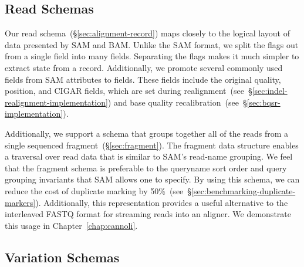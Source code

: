 \documentclass[phd]{ucbthesis}
\begin{document}
\subsection{Read Schemas}
\label{sec:read-schemas}

Our read schema~(\S\ref{sec:alignment-record}) maps closely to the logical layout of data presented by
{SAM} and {BAM}. Unlike the {SAM} format, we split the
flags out from a single field into many fields. Separating the flags makes it much simpler to
extract state from a record. Additionally, we promote several commonly used
fields from {SAM} attributes to fields. These fields include the original
quality, position, and CIGAR fields, which are set during
realignment~(see~\S\ref{sec:indel-realignment-implementation}) and base quality
recalibration~(see~\S\ref{sec:bqsr-implementation}).

Additionally, we support a schema that groups together all of the reads from a
single sequenced fragment~(\S\ref{sec:fragment}). The fragment data structure enables a traversal over read data that
is similar to {SAM}'s read-name grouping.
We feel that the fragment schema is preferable to the queryname sort order and
query grouping invariants that {SAM} allows one to specify. By using this
schema, we can reduce the cost of duplicate marking by
50\%~(see~\S\ref{sec:benchmarking-duplicate-markers}). Additionally, this
representation provides a useful alternative to the interleaved FASTQ format for
streaming reads into an aligner. We demonstrate this usage in
Chapter~\ref{chap:cannoli}.

\subsection{Variation Schemas}
\label{sec:variation-schemas}
\end{document}
